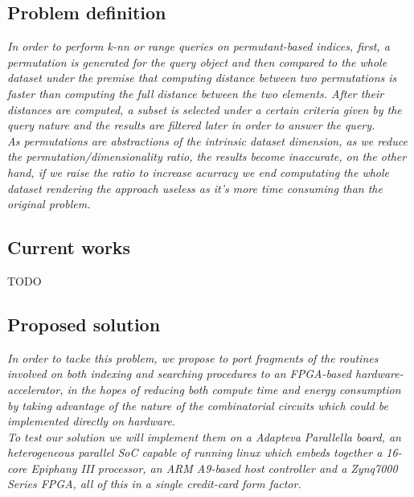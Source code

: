 \documentclass[11pt,letterpaper]{article}
\begin{document}
\subsection{Problem definition} 
\emph{In order to perform k-nn or range queries on permutant-based indices, first, a permutation is generated for the query object and then compared to the whole dataset under the premise that computing distance between two permutations is faster than computing the full distance between the two elements. After their distances are computed, a subset is selected under a certain criteria given by the query nature and the results are filtered later in order to answer the query.
\\
As permutations are abstractions of the intrinsic dataset dimension, as we reduce the permutation/dimensionality ratio, the results become inaccurate, on the other hand, if we raise the ratio to increase acurracy we end computating the whole dataset rendering the approach useless as it's more time consuming than the original problem.
}

\subsection{Current works} 
TODO

\subsection{Proposed solution}
\emph{
    In order to tacke this problem, we propose to port fragments of the routines involved on both indexing and searching procedures to an FPGA-based hardware-accelerator, in the hopes of reducing both compute time and energy consumption by taking advantage of the nature of the combinatorial circuits which could be implemented directly on hardware.
\\
    To test our solution we will implement them on a Adapteva Parallella board, an heterogeneous parallel SoC capable of running linux which embeds together a 16-core Epiphany III processor, an ARM A9-based host controller and a Zynq7000 Series FPGA, all of this in a single credit-card form factor.
}
\end{document}
